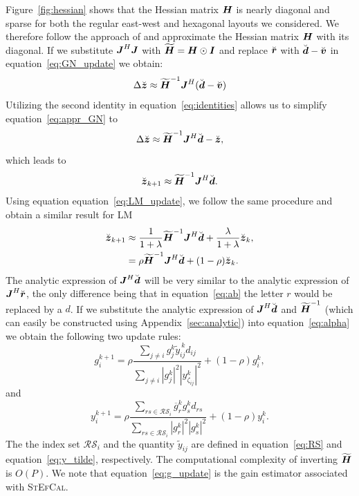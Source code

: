 \documentclass[useAMS,usenatbib]{mn2e}
\newcommand{\bz}{\bmath{z}}
\newcommand{\br}{\bmath{r}}
\newcommand{\bd}{\bmath{d}}
\newcommand{\bv}{\bmath{v}}
\newcommand{\bJ}{\bmath{J}}
\newcommand{\bH}{\bmath{H}}
\newcommand{\bI}{\bmath{I}}
\newcommand{\conj}[1]{\overline{#1}}
\begin{document}
Figure~\ref{fig:hessian} shows that the Hessian matrix $\bH$ is nearly diagonal and sparse for both the regular east-west and hexagonal layouts we considered. We therefore follow the approach of \citet{Smirnov2015} and approximate the Hessian matrix $\bH$ with its diagonal. If we substitute $\bJ^H\bJ$ with $\widetilde{\bH}=\bH\odot\bI$ and replace $\breve{\br}$ with $\breve{\bd} - \breve{\bv}$ in equation~\ref{eq:GN_update} we obtain:
\begin{equation}
\label{eq:appr_GN}
 \Delta \breve{\bz} \approx \widetilde{\bH}^{-1}\bJ^H(\breve{\bd}-\breve{\bv})
\end{equation}
Utilizing the second identity in equation~\ref{eq:identities} allows us to simplify equation~\ref{eq:appr_GN} to
\begin{equation}
  \Delta \breve{\bz} \approx \widetilde{\bH}^{-1}\bJ^H\breve{\bd}-\breve{\bz},
\end{equation}
which leads to
\begin{equation}
 \breve{\bz}_{k+1} \approx \widetilde{\bH}^{-1}\bJ^H\breve{\bd}.
\end{equation}
Using equation equation~\ref{eq:LM_update}, we follow the same procedure and obtain a similar result for LM
\begin{align}
\breve{\bz}_{k+1} &\approx \frac{1}{1+\lambda}\widetilde{\bH}^{-1}\bJ^H\breve{\bd} + \frac{\lambda}{1+\lambda} \breve{\bz}_k,\label{eq:lambda}\\
 &= \rho \widetilde{\bH}^{-1}\bJ^H\breve{\bd} + (1-\rho)\breve{\bz}_k. \label{eq:alpha}  
\end{align}
The analytic expression of $\bJ^H\breve{\bd}$ will be very similar to the analytic 
expression of $\bJ^H\breve{\br}$, the only difference being that in equation~\ref{eq:ab} the letter $r$ would be replaced by a $d$. If we substitute the analytic expression
of $\bJ^H\breve{\bd}$ and $\widetilde{\bH}^{-1}$ (which can easily be constructed using Appendix~\ref{sec:analytic}) into equation~\ref{eq:alpha} we obtain the following two update rules:
\begin{equation}
\label{eq:g_update}
g_{i}^{k+1} = \rho \frac{\sum_{j\neq i} g_j^k \widetilde{y}_{ij}^{~\!\!k} d_{ij}}{\sum_{j\neq i} |g_j^k|^2|y_{\zeta_{ij}}^k|^2} + (1-\rho) g_i^k, 
\end{equation}
and
\begin{equation}
\label{eq:y_update}
y_{i}^{k+1} = \rho \frac{\sum_{rs \in \mathcal{RS}_i} \conj{g}_r^k g_s^k d_{rs}}{\sum_{rs \in \mathcal{RS}_i}|g_r^k|^2|g_s^k|^2} + (1-\rho) y_i^k. 
\end{equation}
The the index set $\mathcal{RS}_i$ and the quantity $\widetilde{y}_{ij}$ are defined in equation~\ref{eq:RS} and equation~\ref{eq:y_tilde}, respectively. 
The computational complexity of inverting $\widetilde{\bH}$ is $O(P)$. We note that equation~\ref{eq:g_update} is the gain estimator associated with \textsc{StEfCal}.
\end{document}
